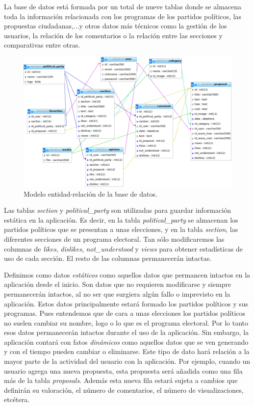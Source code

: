 La base de datos está formada por un total de nueve tablas donde se almacena toda la información relacionada con los programas de los partidos políticos, las propuestas ciudadanas,...y otros datos más técnicos como la gestión de los usuarios, la relación de los comentarios o la relación entre las secciones y comparativas entre otras.

\begin{figure}[!]
\centering
\includegraphics[keepaspectratio, scale=0.40]{Media/Captures/database.png}
\caption{Modelo entidad-relación de la base de datos.}
\label{fig:ermodel}
\end{figure}

Las tablas \textit{section} y \textit{political\_party} son utilizadas para guardar información estática en la aplicación. Es decir, en la tabla \textit{political\_party} se almacenan los partidos políticos que se presentan a unas elecciones, y en la tabla \textit{section}, las diferentes secciones de un programa electoral. Tan sólo modificaremos las columnas de \textit{likes}, \textit{dislikes}, \textit{not\_understood} y \textit{views} para obtener estadísticas de uso de cada sección. El resto de las columnas permanecerán intactas.

Definimos como datos \textit{estáticos} como aquellos datos que permancen intactos en la aplicación desde el inicio. Son datos que no requieren modificarse y siempre permanecerán intactos, al no ser que surgiera algún fallo o imprevisto en la aplicación. Estos datos principalmente estará formado los partidos políticos y sus programas. Pues entendemos que de cara a unas elecciones los partidos políticos no suelen cambiar su nombre, logo o lo que es el programa electoral. Por lo tanto esos datos permanecerán intactos durante el uso de la aplicación. Sin embargo, la aplicación contará con fatos \textit{dinámicos} como aquellos datos que se ven generando y con el tiempo pueden cambiar o eliminarse. Este tipo de dato hará relación a la mayor parte de la actividad del usuario con la aplicación. Por ejemplo, cuando un usuario agrega una nueva propuesta, esta propuesta será añadida como una fila más de la tabla \textit{proposals}. Además esta nueva fila estará sujeta a cambios que definirán su valoración, el número de comentarios, el número de visualizaciones, etcétera.

